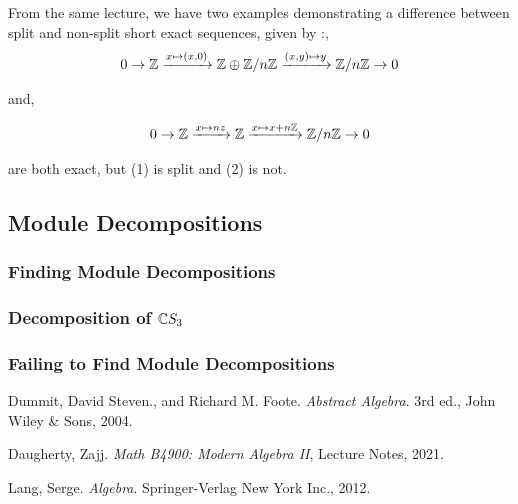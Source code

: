 \documentclass[11pt, reqno]{amsart}
\theoremstyle{plain}
\theoremstyle{definition}
\theoremstyle{example}
\begin{document}
\par
From the same lecture, we have two examples demonstrating a difference between split and non-split short exact sequences, given by \cite[Lec 10, p.7]{dau}:,
\begin{align}
0 \rightarrow \mathbb{Z} \xrightarrow{x \mapsto (x,0)} \mathbb{Z} \oplus \mathbb{Z}/n\mathbb{Z} \xrightarrow{(x,y) \mapsto y} \mathbb{Z}/n\mathbb{Z} \rightarrow 0
\end{align}

and,

\begin{align}
0 \rightarrow \mathbb{Z} \xrightarrow{x \mapsto nz} \mathbb{Z} \xrightarrow{x \mapsto x + n\mathbb{Z}} \mathbb{Z}/n\mathbb{Z} \rightarrow 0
\end{align}

are both exact, but (1) is split and (2) is not.

\newpage
\subsection{Module Decompositions}

\subsubsection{Finding Module Decompositions}

\subsubsection{Decomposition of $\mathbb{C} S_3$}

\subsubsection{Failing to Find Module Decompositions}






\newpage
\begin{thebibliography}{9}

Dummit, David Steven., and Richard M. Foote. \textit{Abstract Algebra}. 3rd ed., John Wiley \& Sons, 2004. 

Daugherty, Zajj. \textit{Math B4900: Modern Algebra II}, Lecture Notes, 2021.

Lang, Serge. \textit{Algebra}. Springer-Verlag New York Inc., 2012. 

\end{thebibliography}
\end{document}
